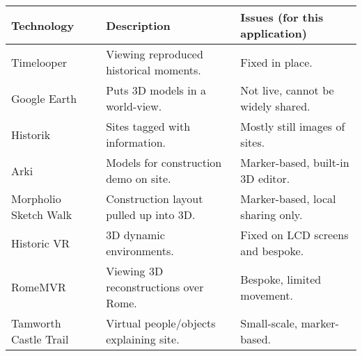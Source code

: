 \documentclass{article}
\newcommand{\mycomment}[1]{}
\begin{document}
\begin{table}[]
\begin{tabular}{|l|l|l|}
\hline
\rowcolor[HTML]{EFEFEF} 
\textbf{Technology}   & \textbf{Description}                    & \textbf{Issues (for this application)} \\ \hline
Timelooper \cite{timelooper}     & Viewing reproduced historical moments.  & Fixed in place.                        \\ \hline
Google Earth \cite{googleearth}   & Puts 3D models in a world-view.         & Not live, cannot be widely shared.     \\ \hline
Historik \cite{historik}       & Sites tagged with information.          & Mostly still images of sites.          \\ \hline
Arki \cite{arki}           & Models for construction demo on site.   & Marker-based, built-in 3D editor.      \\ \hline
Morpholio Sketch Walk \cite{morpholio} & Construction layout pulled up into 3D.  & Marker-based, local sharing only.      \\ \hline
Historic VR \cite{historicvr}          & 3D dynamic environments.                & Fixed on LCD screens and bespoke.      \\ \hline
RomeMVR \cite{romemvr}              & Viewing 3D reconstructions over Rome.   & Bespoke, limited movement.             \\ \hline
Tamworth Castle Trail \cite{tamworth} & Virtual people/objects explaining site. & Small-scale, marker-based.             \\ \hline
\end{tabular}
\end{table}

\mycomment{
- https://www.timelooper.com/
lets viewers experience various historical moments—George Washington’s second inaugural address, the construction of the Empire State Building, the Great Fire of London.
fixed point
- google earth
virtual only not immersive, import 3d models and view locally
- https://www.historik.com/
mostly stills
- https://www.darfdesign.com/arki.html
- morpholio sketch walk 
anchor based and local collab only
https://morpholioapps.com/trace/
- https://gamma-ar.com/
seems pretty perfect to me....
- https://historicvr.com/index.php
fixed on lcd screens and bespoke
- rome mvr
https://apps.apple.com/us/app/rome-mvr-time-window/id997392001
bespoke, limited walkabout
- tamworth castle
https://www.tamworthcastle.co.uk/ar-trail
anchors on the floor in each room
}
\end{document}
